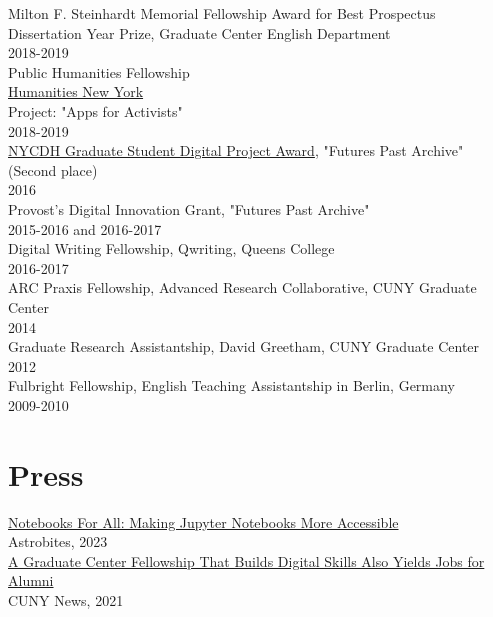 \documentclass[11pt]{article}
\begin{document}
Milton F. Steinhardt Memorial Fellowship Award for Best Prospectus\\[0pt]
Dissertation Year Prize, Graduate Center English Department\\[0pt]
2018-2019\\[0pt]

Public Humanities Fellowship\\[0pt]
\href{https://humanitiesny.org/}{Humanities New York}\\[0pt]
Project: "Apps for Activists"\\[0pt]
2018-2019\\[0pt]

\href{https://nycdh.org/nyc-dh-graduate-student-project-award/}{NYCDH Graduate Student Digital Project Award}, "Futures Past Archive" (Second place)\\[0pt]
2016\\[0pt]

Provost's Digital Innovation Grant, "Futures Past Archive"\\[0pt]
2015-2016 and 2016-2017\\[0pt]

Digital Writing Fellowship, Qwriting, Queens College\\[0pt]
2016-2017\\[0pt]

ARC Praxis Fellowship, Advanced Research Collaborative, CUNY Graduate Center\\[0pt]
2014\\[0pt]

Graduate Research Assistantship, David Greetham, CUNY Graduate Center\\[0pt]
2012\\[0pt]

Fulbright Fellowship, English Teaching Assistantship in Berlin, Germany\\[0pt]
2009-2010\\[0pt]

\section*{Press}
\label{sec:org48fb330}
\href{https://astrobites.org/2023/06/10/notebooks-for-all/}{Notebooks For All: Making Jupyter Notebooks More Accessible}\\[0pt]
Astrobites, 2023\\[0pt]

\href{https://m.gc.cuny.edu/News/Detail?id=60526}{A Graduate Center Fellowship That Builds Digital Skills Also Yields Jobs for Alumni}\\[0pt]
CUNY News, 2021\\[0pt]
\end{document}
